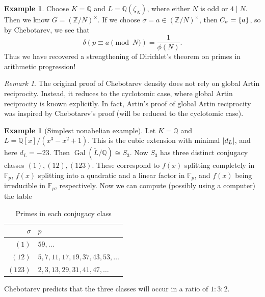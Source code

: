 \documentclass[leqno, openany]{memoir}
\theoremstyle{definition}
\newtheorem{exm}[thm]{Example}
\theoremstyle{remark}
\newtheorem{rmk}[thm]{Remark}
\theoremstyle{plain}
\theoremstyle{definition}
\theoremstyle{remark}
\newcommand{\F}{\mathbb{F}}
\newcommand{\Z}{\mathbb{Z}}
\newcommand{\Q}{\mathbb{Q}}
\newcommand{\wt}[1]{\widetilde{#1}}
\DeclareMathOperator{\Gal}{Gal}
\begin{document}
\begin{exm}
    Choose $K = \Q$ and $L = \Q(\zeta_N)$, where either $N$ is odd or $4 \mid N$. Then we know $G = {(\Z/N)}^{\times}$. If we choose $\sigma = a \in {(\Z/N)}^{\times}$, then $C_{\sigma} = \qty{a}$, so by Chebotarev, we see that 
    \[ \delta(p \equiv a \pmod{N}) = \frac{1}{\phi(N)}. \]
    Thus we have recovered a strengthening of Dirichlet's theorem on primes in arithmetic progression!
\end{exm}

\begin{rmk}
    The original proof of Chebotarev density does not rely on global Artin reciprocity. Instead, it reduces to the cyclotomic case, where global Artin reciprocity is known explicitly. In fact, Artin's proof of global Artin reciprocity was inspired by Chebotarev's proof (will be reduced to the cyclotomic case).
\end{rmk}

\begin{exm}[Simplest nonabelian example]
    Let $K = \Q$ and $L = \Q[x] / (x^3 - x^2 + 1)$. This is the cubic extension with minimal $\abs{d_L}$, and here $d_L = -23$. Then $\Gal(\wt{L}/\Q) \cong S_3$. Now $S_3$ has three distinct conjugacy classes $(1), (12), (123)$. These correspond to $f(x)$ splitting completely in $\F_p$, $f(x)$ splitting into a quadratic and a linear factor in $\F_p$, and $f(x)$ being irreducible in $\F_p$, respectively. Now we can compute (possibly using a computer) the table
    \begin{table}[H]
        \centering
        \caption{Primes in each conjugacy class}
        \label{tab:primes-each-conjugacy-class}
        \begin{tabular}{rl}
        \toprule
        $\sigma$ & $p$ \\
        \midrule
        $(1)$ & $59, \ldots$ \\
        $(12)$ & $5,7,11,17,19,37,43,53,\ldots$ \\
        $(123)$ & $2,3,13,29,31,41,47,\ldots$ \\
        \bottomrule
        \end{tabular}
    \end{table}
    Chebotarev predicts that the three classes will occur in a ratio of $1:3:2$.
\end{exm}
\end{document}
